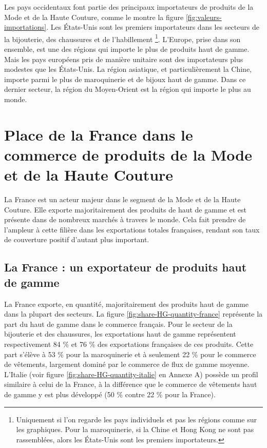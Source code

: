 \documentclass[french,10pt,a4paper]{article}
\begin{document}
Les pays occidentaux font partie des principaux importateurs de produits de la Mode et de la Haute Couture, comme le montre la figure \ref{fig:valeurs-importations}. Les États-Unis sont les premiers importateurs dans les secteurs de la bijouterie, des chaussures et de l'habillement \footnote{Uniquement si l'on regarde les pays individuels et pas les régions comme sur les graphiques. Pour la maroquinerie, si la Chine et Hong Kong ne sont pas rassemblées, alors les États-Unis sont les premiers importateurs.}. L'Europe, prise dans son ensemble, est une des régions qui importe le plus de produits haut de gamme. Mais les pays européens pris de manière unitaire sont des importateurs plus modestes que les États-Unis. La région asiatique, et particulièrement la Chine, importe parmi le plus de maroquinerie et de bijoux haut de gamme. Dans ce dernier secteur, la région du Moyen-Orient est la région qui importe le plus au monde.


\newpage

\section{Place de la France dans le commerce de produits de la Mode et de la Haute Couture}

La France est un acteur majeur dans le segment de la Mode et de la Haute Couture. Elle exporte majoritairement des produits de haut de gamme et est présente dans de nombreux marchés à travers le monde. Cela fait prendre de l'ampleur à cette filière dans les exportations totales françaises, rendant son taux de couverture positif d'autant plus important.


\subsection{La France : un exportateur de produits haut de gamme}

La France exporte, en quantité, majoritairement des produits haut de gamme dans la plupart des secteurs. La figure \ref{fig:share-HG-quantity-france} représente la part du haut de gamme dans le commerce français. Pour le secteur de la bijouterie et des chaussures, les exportations haut de gamme représentent respectivement 84 \% et 76 \% des exportations françaises de ces produits. Cette part s'élève à 53 \% pour la maroquinerie et à seulement 22 \% pour le commerce de vêtements, largement dominé par le commerce de flux de gamme moyenne. L'Italie (voir figure \ref{fig:share-HG-quantity-italie} en Annexe A) possède un profil similaire à celui de la France, à la différence que le commerce de vêtements haut de gamme y est plus développé (50 \% contre 22 \% pour la France).
\end{document}
